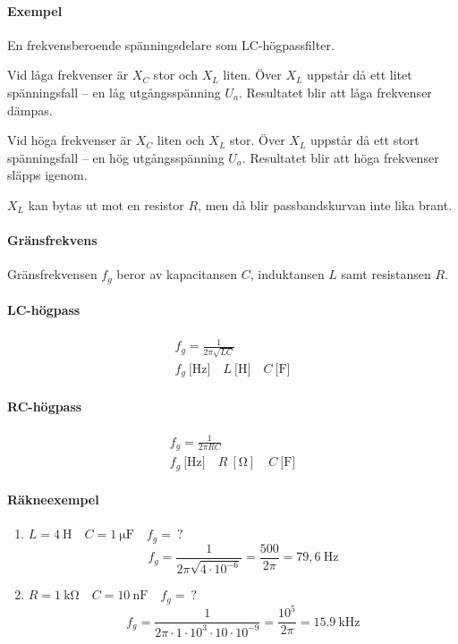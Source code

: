 \paragraph{Exempel} En frekvensberoende spänningsdelare som LC-högpassfilter.

Vid låga frekvenser är \(X_C\) stor och \(X_L\) liten.
Över \(X_L\) uppstår då ett litet spänningsfall -- en låg utgångsspänning \(U_a\).
Resultatet blir att låga frekvenser dämpas.

Vid höga frekvenser är \(X_C\) liten och \(X_L\) stor.
Över \(X_L\) uppstår då ett stort spänningsfall -- en hög utgångsspänning
\(U_a\).
Resultatet blir att höga frekvenser släpps igenom.

\(X_L\) kan bytas ut mot en resistor \(R\), men då blir passbandskurvan inte lika brant.

\paragraph{Gränsfrekvens}

Gränsfrekvensen \(f_g\) beror av kapacitansen \(C\), induktansen \(L\) samt
resistansen \(R\).

\paragraph{LC-högpass}
\begin{gather*}
  f_g = \frac{1}{2\pi \sqrt{LC}} \\
  f_g\ \text{[Hz]} \quad L\ \text{[H]} \quad C\ \text{[F]}
\end{gather*}

\paragraph{RC-högpass}
\begin{gather*}
  f_g = \frac{1}{2\pi RC}\\
  f_g\ \text{[Hz]} \quad R\ [\si{\ohm}] \quad C\ \text{[F]}
\end{gather*}

\paragraph{Räkneexempel}
\begin{enumerate}
\item \(L = 4\ \text{H} \quad C = 1\ \si{\micro\farad} \quad f_g =\ ?\)
  \[
  f_g = \frac{1}{2\pi \sqrt{4 \cdot 10^{-6}}} = \frac{500}{2\pi }
  = 79,6\ \text{Hz}
  \]
\item \(R = \SI{1}{\kilo\ohm} \quad C = 10\ \text{nF} \quad f_g =\ ?\)
  \[
    f_g = \frac{1}{2\pi  \cdot 1 \cdot 10^3 \cdot 10 \cdot 10^{-9}}
    = \frac{10^5}{2\pi } = \SI{15,9}{\kilo\hertz}
  \]
\end{enumerate}


